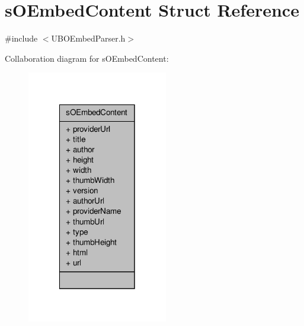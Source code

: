 \hypertarget{structs_o_embed_content}{\section{s\-O\-Embed\-Content Struct Reference}
\label{d9/d62/structs_o_embed_content}
}


{\ttfamily \#include $<$U\-B\-O\-Embed\-Parser.\-h$>$}



Collaboration diagram for s\-O\-Embed\-Content\-:
\nopagebreak
\begin{figure}[H]
\begin{center}
\leavevmode
\includegraphics[width=174pt]{d7/d6b/structs_o_embed_content__coll__graph}
\end{center}
\end{figure}

